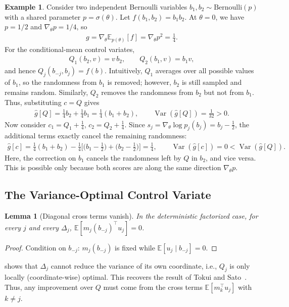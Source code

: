 \documentclass[10pt]{article}
\providecommand{\E}{\mathbb{E}}
\providecommand{\Var}{\operatorname{Var}}
\theoremstyle{plain}
\newtheorem{lemma}[theorem]{Lemma}
\theoremstyle{definition}
\theoremstyle{remark}
\theoremstyle{definition}
\newtheorem{example}[theorem]{Example}
\newcommand{\score}[1]{s_{#1}}               %
\newcommand{\ghat}[1]{\hat g[#1]}            %
\newcommand{\gtrue}{g}                       %
\newcommand{\pj}[1]{p_{#1}}                  %
\begin{document}
\begin{example}\label{ex:two-bernoulli}
    Consider two independent Bernoulli variables $b_1, b_2 \sim \mathrm{Bernoulli}(p)$ with a shared parameter $p = \sigma(\theta)$. Let $f(b_1, b_2) = b_1b_2$. At $\theta = 0$, we have $p=1/2$ and $\nabla_\theta p = 1/4$, so
    \begin{align}
        \gtrue=\nabla_\theta\E_{p(\theta)}[f]=\nabla_\theta p^2=\tfrac14 .
    \end{align}
    For the conditional-mean control variates,
    \begin{align}
        Q_1 (b_2, v) = v\,b_2, \qquad Q_2 (b_1, v) = b_1 v,
    \end{align}
    and hence $Q_j(b_{-j},b_j)=f(b)$. Intuitively, $Q_1$ averages over all possible values of $b_1$, so the randomness from $b_1$ is removed; however, $b_2$ is still sampled and remains random. Similarly, $Q_2$ removes the randomness from $b_2$ but not from $b_1$. Thus, substituting $c=Q$ gives
    \begin{align}
        \ghat{Q} = \tfrac14 b_2 + \tfrac14 b_1 = \tfrac14(b_1+b_2),
        \qquad
        \Var(\ghat{Q}) = \tfrac{1}{32} > 0 .
    \end{align}
    Now consider $c_1 = Q_1 + \tfrac14$, $c_2 = Q_2 + \tfrac14$. Since $\score{j}=\nabla_\theta\log\pj{j}(b_j)=b_j-\tfrac12$, the additional terms exactly cancel the remaining randomness:
    \begin{align}
        \ghat{c} = \tfrac14(b_1+b_2) - \tfrac14\Big[\big(b_1-\tfrac12\big) + \big(b_2-\tfrac12\big)\Big] = \tfrac14 ,
        \qquad
        \Var(\ghat{c}) = 0 < \Var(\ghat{Q}).
    \end{align}
    Here, the correction on $b_1$ cancels the randomness left by $Q$ in $b_2$, and vice versa. This is possible only because both scores are along the same direction $\nabla_\theta p$.
\end{example}

\subsection{The Variance-Optimal Control Variate}\label{sec:optimal}

\begin{lemma}[Diagonal cross terms vanish]\label{lem:diag}
    In the deterministic factorized case, for every $j$ and every $\Delta_j$, $\E[m_j(b_{-j})^{\top}u_j]=0$.
\end{lemma}
\begin{proof}
    Condition on $b_{-j}$: $m_j(b_{-j})$ is fixed while $\E[u_j\mid b_{-j}]=0$.
\end{proof}
 shows that $\Delta_j$ cannot reduce the variance of its own coordinate, i.e., $Q_j$ is only locally (coordinate-wise) optimal. This recovers the result of Tokui and Sato~\cite{tokui2017}. Thus, any improvement over $Q$ must come from the cross terms $\E[m_k^{\top}u_j]$ with $k\neq j$.
\end{document}
